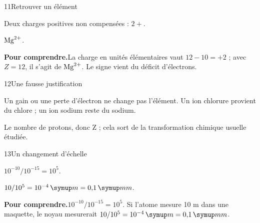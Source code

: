 \par\noindent\begin{minipage}{\linewidth}
\begin{corrige}{11}{Retrouver un élément}
\begin{questions}
\item Deux charges positives non compensées : $2+$.
\item $\ce{Mg^{2+}}$.
\end{questions}
\par\smallskip\noindent\textbf{Pour comprendre.}\enspace La charge en unités élémentaires vaut $12-10=+2$ ; avec $Z=12$, il s’agit de $\ce{Mg^2+}$. Le signe vient du déficit d’électrons.\par
{}
\end{corrige}
\end{minipage}
\par\noindent\begin{minipage}{\linewidth}
\begin{corrige}{12}{Une fausse justification}
\begin{questions}
\item Un gain ou une perte d’électron ne change pas l’élément. Un ion chlorure provient du chlore ; un ion sodium reste du sodium.
\item Le nombre de protons, donc Z ; cela sort de la transformation chimique usuelle étudiée.
\end{questions}
\end{corrige}
\end{minipage}
\par\noindent\begin{minipage}{\linewidth}
\begin{corrige}{13}{Un changement d’échelle}
\begin{questions}
\item $10^{-10}/10^{-15}=10^5$.
\item $10/10^5=10^{-4}\unite m=0{,}1\unite{mm}$.
\end{questions}
\par\smallskip\noindent\textbf{Pour comprendre.}\enspace $10^{-10}/10^{-15}=10^5$. Si l’atome mesure 10 m dans une maquette, le noyau mesurerait $10/10^5=10^{-4}\unite m=0{,}1\unite{mm}$.\par
{}
\end{corrige}
\end{minipage}
